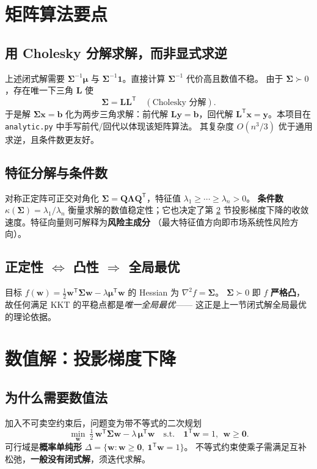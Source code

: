 \documentclass[12pt]{ctexart}
\newcommand{\w}{\bm{w}}
\newcommand{\muv}{\bm{\mu}}
\newcommand{\Sig}{\bm{\Sigma}}
\newcommand{\one}{\mathbf{1}}
\newcommand{\T}{^{\mathsf{T}}}
\newcommand{\Sinv}{\Sig^{-1}}
\theoremstyle{definition}
\theoremstyle{plain}
\begin{document}
\section{矩阵算法要点}

\subsection{用 Cholesky 分解求解，而非显式求逆}
上述闭式解需要 $\Sinv\muv$ 与 $\Sinv\one$。直接计算 $\Sinv$ 代价高且数值不稳。
由于 $\Sig\succ0$，存在唯一下三角 $\bm L$ 使
\begin{equation}
\Sig=\bm L\bm L\T \quad(\text{Cholesky 分解}).
\end{equation}
于是解 $\Sig\bm x=\bm b$ 化为两步三角求解：前代解 $\bm L\bm y=\bm b$，回代解
$\bm L\T\bm x=\bm y$。本项目在 \texttt{analytic.py} 中手写前代/回代以体现该矩阵算法。
其复杂度 $O(n^3/3)$ 优于通用求逆，且条件数更友好。

\subsection{特征分解与条件数}
对称正定阵可正交对角化 $\Sig=\bm Q\bm\Lambda\bm Q\T$，特征值 $\lambda_1\ge\cdots\ge\lambda_n>0$。
\textbf{条件数} $\kappa(\Sig)=\lambda_1/\lambda_n$ 衡量求解的数值稳定性；它也决定了第
\ref{sec:numeric} 节投影梯度下降的收敛速度。特征向量则可解释为\textbf{风险主成分}
（最大特征值方向即市场系统性风险方向）。

\subsection{正定性 $\Leftrightarrow$ 凸性 $\Rightarrow$ 全局最优}
目标 $f(\w)=\tfrac12\w\T\Sig\w-\lambda\muv\T\w$ 的 Hessian 为 $\nabla^2 f=\Sig$。
$\Sig\succ0$ 即 $f$ \textbf{严格凸}，故任何满足 KKT 的平稳点都是\emph{唯一全局最优}——
这正是上一节闭式解全局最优的理论依据。

\section{数值解：投影梯度下降}
\label{sec:numeric}

\subsection{为什么需要数值法}
加入不可卖空约束后，问题变为带不等式的二次规划
\begin{equation}
\min_{\w}\ \tfrac12\,\w\T\Sig\w-\lambda\,\muv\T\w
\quad\text{s.t.}\quad \one\T\w=1,\ \ \w\ge\bm 0 .
\label{eq:qp}
\end{equation}
可行域是\textbf{概率单纯形} $\Delta=\{\w:\w\ge\bm0,\ \one\T\w=1\}$。
不等式约束使乘子需满足互补松弛，\textbf{一般没有闭式解}，须迭代求解。
\end{document}
